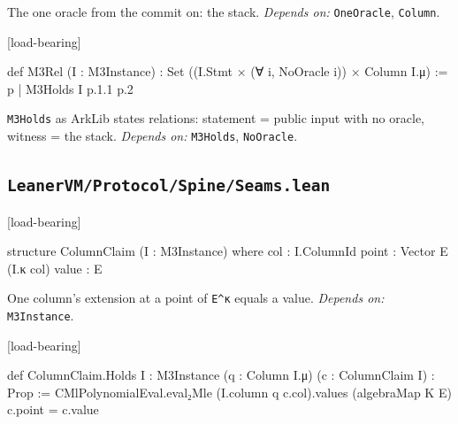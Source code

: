 
The one oracle from the commit on: the stack. \emph{Depends on:} \texttt{OneOracle}, \texttt{Column}.

\par\medskip\noindent\textbf{}\hfill\textsf{\small [load-bearing]}\par\nopagebreak

\begin{leancode}
def M3Rel (I : M3Instance) : Set ((I.Stmt × (∀ i, NoOracle i)) × Column I.μ) :=
  {p | M3Holds I p.1.1 p.2}
\end{leancode}


\texttt{M3Holds} as ArkLib states relations: statement = public input with no oracle, witness = the stack. \emph{Depends on:} \texttt{M3Holds}, \texttt{NoOracle}.

\subsection{\texttt{LeanerVM/Protocol/Spine/Seams.lean}}\label{sec:gen-cat-spine-Seams}

\par\medskip\noindent\textbf{}\hfill\textsf{\small [load-bearing]}\par\nopagebreak

\begin{leancode}
structure ColumnClaim (I : M3Instance) where
  col : I.ColumnId
  point : Vector E (I.κ col)
  value : E
\end{leancode}


One column's extension at a point of \texttt{E\textasciicircum{}κ} equals a value. \emph{Depends on:} \texttt{M3Instance}.

\par\medskip\noindent\textbf{}\hfill\textsf{\small [load-bearing]}\par\nopagebreak

\begin{leancode}
def ColumnClaim.Holds {I : M3Instance} (q : Column I.μ) (c : ColumnClaim I) : Prop :=
  CMlPolynomialEval.eval₂Mle (I.column q c.col).values (algebraMap K E) c.point = c.value
\end{leancode}

